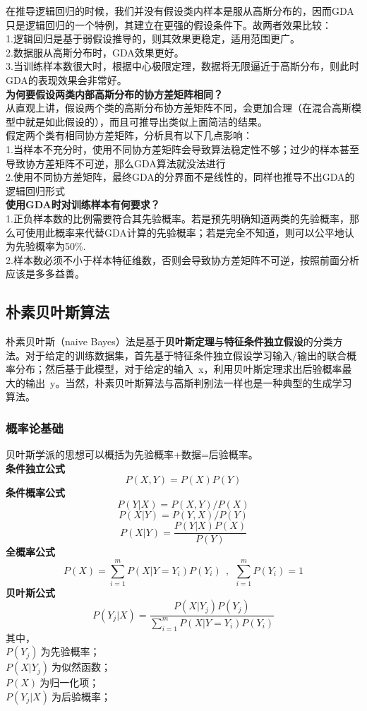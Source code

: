在推导逻辑回归的时候，我们并没有假设类内样本是服从高斯分布的，因而GDA只是逻辑回归的一个特例，其建立在更强的假设条件下。故两者效果比较：\\
1.逻辑回归是基于弱假设推导的，则其效果更稳定，适用范围更广。\\
2.数据服从高斯分布时，GDA效果更好。\\
3.当训练样本数很大时，根据中心极限定理，数据将无限逼近于高斯分布，则此时GDA的表现效果会非常好。\\

\noindent\textbf{为何要假设两类内部高斯分布的协方差矩阵相同？}\\
从直观上讲，假设两个类的高斯分布协方差矩阵不同，会更加合理（在混合高斯模型中就是如此假设的），而且可推导出类似上面简洁的结果。\\
假定两个类有相同协方差矩阵，分析具有以下几点影响：\\
1.当样本不充分时，使用不同协方差矩阵会导致算法稳定性不够；过少的样本甚至导致协方差矩阵不可逆，那么GDA算法就没法进行\\
2.使用不同协方差矩阵，最终GDA的分界面不是线性的，同样也推导不出GDA的逻辑回归形式\\

\noindent\textbf{使用GDA时对训练样本有何要求？}\\
1.正负样本数的比例需要符合其先验概率。若是预先明确知道两类的先验概率，那么可使用此概率来代替GDA计算的先验概率；若是完全不知道，则可以公平地认为先验概率为50\%.\\
2.样本数必须不小于样本特征维数，否则会导致协方差矩阵不可逆，按照前面分析应该是多多益善。

\newpage
\subsection{朴素贝叶斯算法}
朴素贝叶斯（naive Bayes）法是基于\textbf{贝叶斯定理}与\textbf{特征条件独立假设}的分类方法。对于给定的训练数据集，首先基于特征条件独立假设学习输入/输出的联合概率分布；然后基于此模型，对于给定的输入~x，利用贝叶斯定理求出后验概率最大的输出~y。当然，朴素贝叶斯算法与高斯判别法一样也是一种典型的生成学习算法。

\subsubsection{概率论基础}
贝叶斯学派的思想可以概括为先验概率+数据=后验概率。\\
\noindent\textbf{条件独立公式}\\
$$P(X,Y)=P(X)P(Y)$$
\noindent\textbf{条件概率公式}\\
$$P(Y|X)=P(X,Y)/P(X)$$
$$P(X|Y)=P(Y,X)/P(Y)$$
$$P(X|Y)=\frac{P(Y|X)P(X)}{P(Y)}$$
\noindent\textbf{全概率公式}\\
$$P(X)=\sum_{i=1}^{m}P(X|Y=Y_i)P(Y_i)~~,~~\sum_{i=1}^{m}P(Y_i)=1$$
\noindent\textbf{贝叶斯公式}\\
$$P(Y_j|X)=\frac{P(X|Y_j)P(Y_j)}{\sum_{i=1}^{m}P(X|Y=Y_i)P(Y_i)}$$
其中，\\
$P(Y_j)~$为先验概率；\\
$P(X|Y_j)~$为似然函数；\\
$P(X)~$为归一化项；\\
$P(Y_j|X)~$为后验概率；\\

